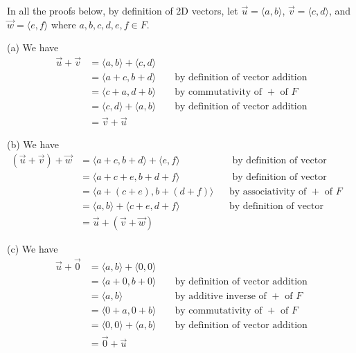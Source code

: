 \proof
In all the proofs below, by definition of 2D vectors, let
$\vec{u} = \langle a, b \rangle$,
$\vec{v} = \langle c, d \rangle$, and
$\vec{w} = \langle e, f \rangle$
where $a, b, c, d, e, f \in F$.

(a)
We have
\begin{align*}
  \vec{u} + \vec{v}
  &= \langle a, b \rangle + \langle c, d \rangle \\
  &= \langle a + c, b + d \rangle & & \text{ by definition of vector addition} \\
  &= \langle c + a, d + b\rangle & & \text{ by commutativity of $+$ of $F$} \\
  &= \langle c, d \rangle + \langle a, b \rangle & & \text{ by definition of vector addition} \\
  &= \vec{v} + \vec{u}  
\end{align*}

(b)
We have
\begin{align*}
  (\vec{u} + \vec{v}) + \vec{w}
  &=  \langle a + c, b + d \rangle + \langle e, f \rangle & & \text{ by definition of vector addition} \\
  &=  \langle a + c + e, b + d + f \rangle & & \text{ by definition of vector addition} \\
  &=  \langle a + (c + e), b + (d + f) \rangle & & \text{by associativity of $+$ of $F$} \\
  &= \langle a, b \rangle + \langle c + e, d + f \rangle & & \text{by definition of vector addition} \\
  &= \vec{u} + (\vec{v} + \vec{w})
\end{align*}

(c)
We have
\begin{align*}
  \vec{u} + \vec{0}
  &= \langle a, b \rangle + \langle 0, 0 \rangle \\
  &= \langle a + 0, b + 0 \rangle & & \text{ by definition of vector addition} \\
  &= \langle a, b \rangle & & \text{ by additive inverse of $+$ of $F$} \\
  &= \langle 0 + a, 0 + b\rangle & & \text{ by commutativity of $+$ of $F$} \\
  &= \langle 0, 0 \rangle + \langle a, b \rangle & & \text{ by definition of vector addition} \\
  &= \vec{0} + \vec{u}  
\end{align*}

